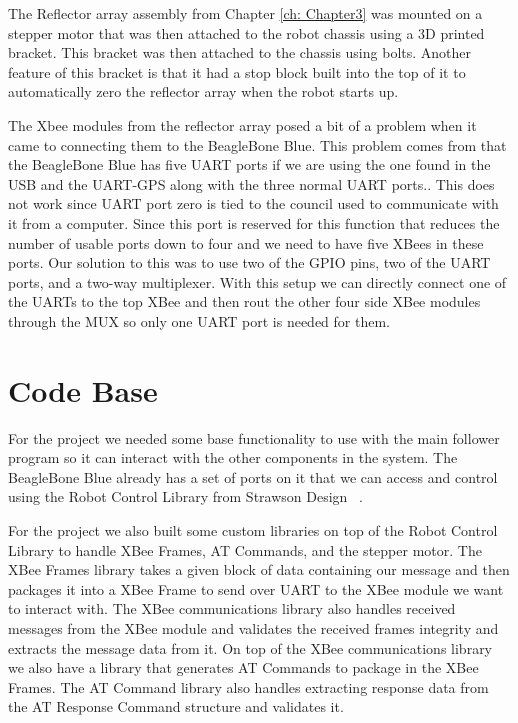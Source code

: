 \vspace*{12pt}
\noindent
The Reflector array assembly from Chapter \ref{ch: Chapter3} was mounted on a stepper motor that was then attached to the robot chassis using a 3D printed bracket. This bracket was then attached to the chassis using bolts. Another feature of this bracket is that it had a stop block built into the top of it to automatically zero the reflector array when the robot starts up.

\vspace*{12pt}
\noindent
The Xbee modules from the reflector array posed a bit of a problem when it came to connecting them to the BeagleBone Blue. This problem comes from that the BeagleBone Blue has five UART ports if we are using the one found in the USB and the UART-GPS along with the three normal UART ports.. This does not work since UART port zero is tied to the council used to communicate with it from a computer. Since this port is reserved for this function that reduces the number of usable ports down to four and we need to have five XBees in these ports. Our solution to this was to use two of the GPIO pins, two of the UART ports, and a two-way multiplexer. With this setup we can directly connect one of the UARTs to the top XBee and then rout the other four side XBee modules through the MUX so only one UART port is needed for them.


\section{Code Base}
\label{sec:Code Base}

For the project we needed some base functionality to use with the main follower program so it can interact with the other components in the system. The BeagleBone Blue already has a set of ports on it that we can access and control using the Robot Control Library from Strawson Design ~\cite{Robot_Control_Library}.

\vspace*{12pt}
\noindent
For the project we also built some custom libraries on top of the Robot Control Library to handle XBee Frames, AT Commands, and the stepper motor. The XBee Frames library takes a given block of data containing our message and then packages it into a XBee Frame to send over UART to the XBee module we want to interact with. The XBee communications library also handles received messages from the XBee module and validates the received frames integrity and extracts the message data from it. On top of the XBee communications library we also have a library that generates AT Commands to package in the XBee Frames. The AT Command library also handles extracting response data from the AT Response Command structure and validates it.

